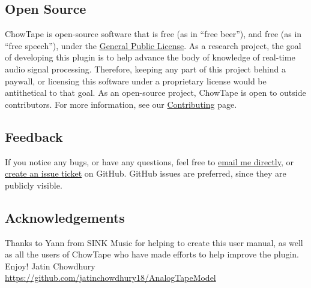 \documentclass[landscape,twocolumn,a5paper]{manual}
\begin{document}
\subsection{Open Source}
ChowTape is open-source software that is free (as in ``free
beer''), and free (as in ``free speech''), under the
\href{https://www.gnu.org/licenses/gpl-3.0}{General Public License}.
As a research project, the goal of developing this plugin is
to help advance the body of knowledge of real-time audio
signal processing. Therefore, keeping any part of this project
behind a paywall, or licensing this software under a proprietary
license would be antithetical to that goal. As an open-source
project, ChowTape is open to outside contributors. For more
information, see our
\href{https://github.com/jatinchowdhury18/AnalogTapeModel/blob/master/CONTRIBUTING.md}{Contributing}
page.
\newpar

\subsection{Feedback}
If you notice any bugs, or have any questions, feel free
to \href{mailto:jatin@ccrma.stanford.edu}{email me directly},
or \href{https://github.com/jatinchowdhury18/AnalogTapeModel/issues}{create an issue ticket}
on GitHub. GitHub issues are preferred, since they are publicly
visible.

\subsection{Acknowledgements}
Thanks to Yann from SINK Music for helping to create this
user manual, as well as all the users of ChowTape who have
made efforts to help improve the plugin.
\newpar
Enjoy!
\newpar
Jatin Chowdhury
\newpar
\href{https://github.com/jatinchowdhury18/AnalogTapeModel}{https://github.com/jatinchowdhury18/AnalogTapeModel}
\end{document}
